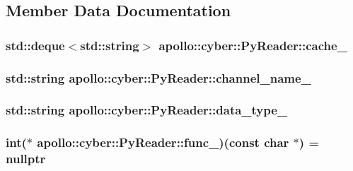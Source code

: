 \subsection{Member Data Documentation}
\hypertarget{classapollo_1_1cyber_1_1PyReader_a5d52ffc981f3a9f4a73db50a0e581951}{
\subsubsection[{cache\-\_\-}]{\setlength{\rightskip}{0pt plus 5cm}std\-::deque$<$std\-::string$>$ apollo\-::cyber\-::\-Py\-Reader\-::cache\-\_\-\hspace{0.3cm}{\ttfamily [private]}}}\label{classapollo_1_1cyber_1_1PyReader_a5d52ffc981f3a9f4a73db50a0e581951}
\hypertarget{classapollo_1_1cyber_1_1PyReader_ad351960d55897e870477559d435edf44}{
\subsubsection[{channel\-\_\-name\-\_\-}]{\setlength{\rightskip}{0pt plus 5cm}std\-::string apollo\-::cyber\-::\-Py\-Reader\-::channel\-\_\-name\-\_\-\hspace{0.3cm}{\ttfamily [private]}}}\label{classapollo_1_1cyber_1_1PyReader_ad351960d55897e870477559d435edf44}
\hypertarget{classapollo_1_1cyber_1_1PyReader_ad76d5814bde082f4cfb80a6530e8fea2}{
\subsubsection[{data\-\_\-type\-\_\-}]{\setlength{\rightskip}{0pt plus 5cm}std\-::string apollo\-::cyber\-::\-Py\-Reader\-::data\-\_\-type\-\_\-\hspace{0.3cm}{\ttfamily [private]}}}\label{classapollo_1_1cyber_1_1PyReader_ad76d5814bde082f4cfb80a6530e8fea2}
\hypertarget{classapollo_1_1cyber_1_1PyReader_a5ac7fd363685049b09cb164e44b94290}{
\subsubsection[{func\-\_\-}]{\setlength{\rightskip}{0pt plus 5cm}int($\ast$ apollo\-::cyber\-::\-Py\-Reader\-::func\-\_\-)(const char $\ast$) = nullptr\hspace{0.3cm}{\ttfamily [private]}}}\label{classapollo_1_1cyber_1_1PyReader_a5ac7fd363685049b09cb164e44b94290}
